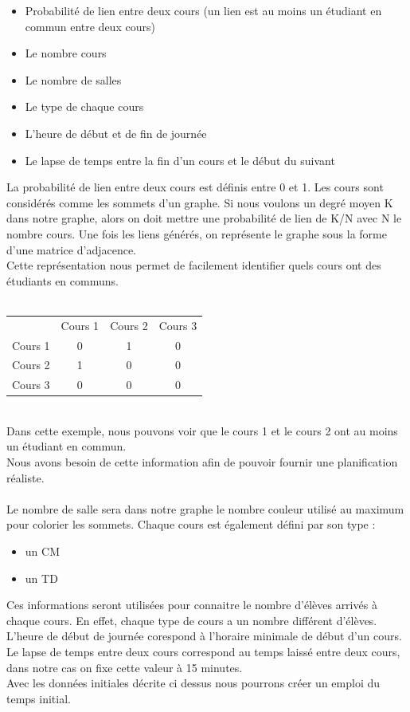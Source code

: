 \documentclass[a4paper,11pt]{article}
\begin{document}
	\begin{itemize}
		\item Probabilité de lien entre deux cours (un lien est au moins un étudiant en commun entre deux cours)
		\item Le nombre cours
		\item Le nombre de salles 
		\item Le type de chaque cours 
		\item L'heure de début et de fin de journée
		\item Le lapse de temps entre la fin d'un cours et le début du suivant
	\end{itemize}

	La probabilité de lien entre deux cours est définis entre 0 et 1. Les cours sont considérés comme les sommets d'un graphe. Si nous voulons un degré moyen K dans notre graphe, alors on doit mettre une probabilité de lien de K/N avec N le nombre cours.
	Une fois les liens générés, on représente le graphe sous la forme d'une matrice d'adjacence. \\
	Cette représentation nous permet de facilement identifier quels cours ont des étudiants en communs.\\
	\\
	\begin{tabular}{ | c | c | c | c |}
		\hline			
		\       & Cours 1 & Cours 2 & Cours 3\\
		Cours 1 &   0     &    1    &     0  \\
		Cours 2 &   1     &    0    &     0  \\
		Cours 3 &   0     &    0    &     0  \\
		\hline  
	\end{tabular}\\
	Dans cette exemple, nous pouvons voir que le cours 1 et le cours 2 ont au moins un étudiant en commun.\\
	Nous avons besoin de cette information afin de pouvoir fournir une planification réaliste.\\
	\\
	Le nombre de salle sera dans notre graphe le nombre couleur utilisé au maximum pour colorier les sommets.
	Chaque cours est également défini par son type :
	\begin{itemize}
		\item un CM
		\item un TD
	\end{itemize}
	Ces informations seront utilisées pour connaitre le nombre d'élèves arrivés à chaque cours. En effet, chaque type de cours a un nombre différent d'élèves.\\
	L'heure de début de journée corespond à l'horaire minimale de début d'un cours.\\
	Le lapse de temps entre deux cours correspond au temps laissé entre deux cours, dans notre cas on fixe cette valeur à 15 minutes.\\
	Avec les données initiales décrite ci dessus nous pourrons créer un emploi du temps initial.
	
\end{document}
